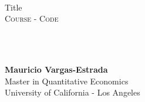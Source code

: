 {
	\parindent0pt
	\ \\ \ \\ \ \\

	\hrulefill
	\vspace{0.0cm}
	\begin{spacing}{1.1}
	{	
		\flushleft
		\fontsize{22pt}{44pt}\selectfont 
		Title
	}\\
	\textsc{Course - Code}
	\end{spacing}

	\ \\ \ \\
	{
		\textbf{Mauricio Vargas-Estrada}\\
		Master in Quantitative Economics\\
		University of California - Los Angeles\par
	}
	\ \\

	\hrulefill
}
